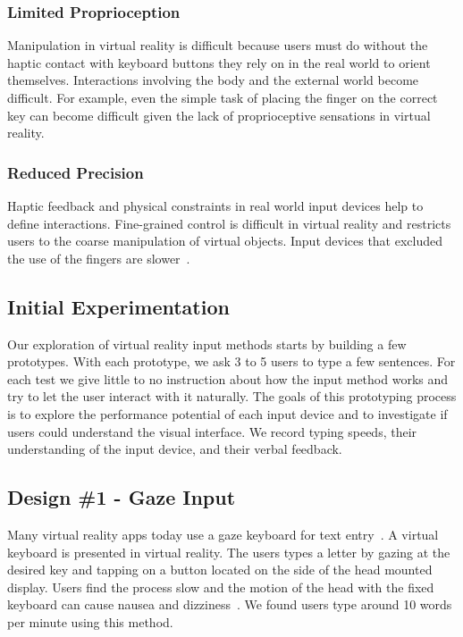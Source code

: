 \subsubsection{Limited Proprioception}
Manipulation in virtual reality is difficult because users must do without the haptic contact with keyboard buttons they rely on in the real world to orient themselves.
Interactions involving the body and the external world become difficult.
For example, even the simple task of placing the finger on the correct key can become difficult given the lack of proprioceptive sensations in virtual reality.

\subsubsection{Reduced Precision}
Haptic feedback and physical constraints in real world input devices help to define interactions. 
Fine-grained control is difficult in virtual reality and restricts users to the coarse manipulation of virtual objects.
Input devices that excluded the use of the fingers are slower~\cite{Zhai:1996:IMG:238386.238534}.  

\subsection{Initial Experimentation}

Our exploration of virtual reality input methods starts by building a few prototypes.
With each prototype, we ask 3 to 5 users to type a few sentences.  
For each test we give little to no instruction about how the input method works and try to let the user interact with it naturally.
The goals of this prototyping process is to explore the performance potential of each input device and to investigate if users could understand the visual interface.
We record typing speeds, their understanding of the input device, and their verbal feedback.

\subsection{Design \#1 - Gaze Input}
Many virtual reality apps today use a gaze keyboard for text entry~\cite{netflix_app_for_oculus}.
A virtual keyboard is presented in virtual reality.
The users types a letter by gazing at the desired key and tapping on a button located on the side of the head mounted display.
Users find the process slow and the motion of the head with the fixed keyboard can cause nausea and dizziness~\cite{atienza2016interaction}.
We found users type around 10 words per minute using this method.


